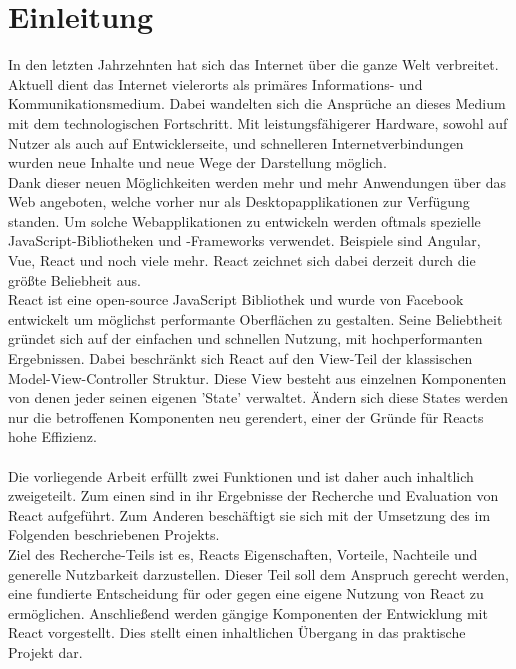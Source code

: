 
\chapter{Einleitung}\label{Einleitung}
In den letzten Jahrzehnten hat sich das Internet über die ganze Welt verbreitet. Aktuell dient das Internet vielerorts als primäres Informations- und Kommunikationsmedium. Dabei wandelten sich die Ansprüche an dieses Medium mit dem technologischen Fortschritt. Mit leistungsfähigerer Hardware, sowohl auf Nutzer als auch auf Entwicklerseite, und schnelleren Internetverbindungen wurden neue Inhalte und neue Wege der Darstellung möglich.\\
Dank dieser neuen Möglichkeiten werden mehr und mehr Anwendungen über das Web angeboten, welche vorher nur als Desktopapplikationen zur Verfügung standen. Um solche Webapplikationen zu entwickeln werden oftmals spezielle JavaScript-Bibliotheken und -Frameworks verwendet. Beispiele sind Angular, Vue, React und noch viele mehr. React zeichnet sich dabei derzeit durch die größte Beliebheit aus.\\
React ist eine open-source JavaScript Bibliothek und wurde von Facebook entwickelt um möglichst performante Oberflächen zu gestalten. Seine Beliebtheit gründet sich auf der einfachen und schnellen Nutzung, mit hochperformanten Ergebnissen. Dabei beschränkt sich React auf den View-Teil der klassischen Model-View-Controller Struktur. Diese View besteht aus einzelnen Komponenten von denen jeder seinen eigenen 'State' verwaltet. Ändern sich diese States werden nur die betroffenen Komponenten neu gerendert, einer der Gründe für Reacts hohe Effizienz.\\\\
Die vorliegende Arbeit erfüllt zwei Funktionen und ist daher auch inhaltlich zweigeteilt. Zum einen sind in ihr Ergebnisse der Recherche und Evaluation von React aufgeführt. Zum Anderen beschäftigt sie sich mit der Umsetzung des im Folgenden beschriebenen Projekts. \\
Ziel des Recherche-Teils ist es, Reacts Eigenschaften, Vorteile, Nachteile und generelle Nutzbarkeit darzustellen. Dieser Teil soll dem Anspruch gerecht werden, eine fundierte Entscheidung für oder gegen eine eigene Nutzung von React zu ermöglichen. Anschließend werden gängige Komponenten der Entwicklung mit React vorgestellt. Dies stellt einen inhaltlichen Übergang in das praktische Projekt dar.\\\\
